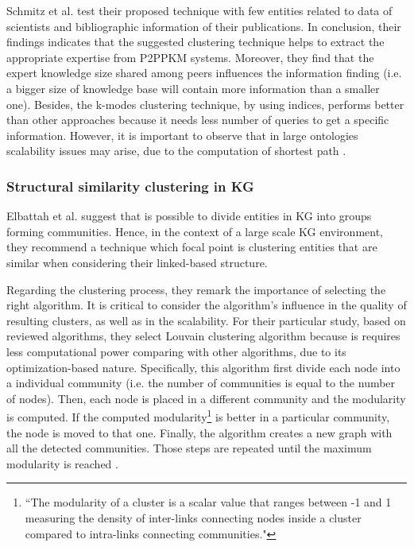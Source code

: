 \documentclass[runningheads]{llncs}
\begin{document}
Schmitz et al. \cite{Schmitz} test their proposed technique with few entities related to data of scientists and bibliographic information of their publications. In conclusion, their findings indicates that the suggested clustering technique helps to extract the appropriate expertise from P2PPKM systems. Moreover, they find that the expert knowledge size shared among peers influences the information finding (i.e. a bigger size of knowledge base will contain more information than a smaller one). Besides, the k-modes clustering technique, by using indices, performs better than other approaches because it needs less number of queries to get a specific information. 
However, it is important to observe that in large ontologies scalability issues may arise, due to the computation of shortest path \cite{Schmitz}.

\subsubsection{Structural similarity clustering in KG} \label{structural-similarity}
Elbattah et al. \cite{Elbattah} suggest that is possible to divide entities in KG into groups forming communities. Hence, in the context of a large scale KG environment, they recommend a technique which focal point is clustering entities that are similar when considering their linked-based structure.

Regarding the clustering process, they remark the importance of selecting the right algorithm. It is critical to consider the algorithm's influence in the quality of resulting clusters, as well as in the scalability. For their particular study, based on reviewed algorithms, they select Louvain clustering algorithm because is requires less computational power comparing with other algorithms, due to its optimization-based nature. Specifically, this algorithm first divide each node into a individual community (i.e. the number of communities is equal to the number of nodes). Then, each node is placed in a different community and the modularity is computed. If the computed modularity\footnote{``The modularity of a cluster is a scalar value that ranges between -1 and 1 measuring the density of inter-links connecting nodes inside a cluster compared to intra-links connecting communities."\cite{Elbattah}} is better in a particular community, the node is moved to that one. Finally, the algorithm creates a new graph with all the detected communities. Those steps are repeated until the maximum modularity is reached \cite{Elbattah}.
\end{document}
